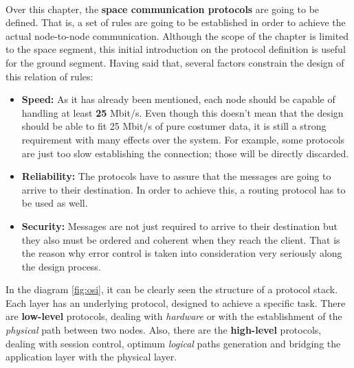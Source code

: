 \paragraph{}
Over this chapter, the \textbf{space communication protocols} are going to be defined. That is, a set of rules are going to be established in order to achieve the actual node-to-node communication. Although the scope of the chapter is limited to the space segment, this initial introduction on the protocol definition is useful for the ground segment.
Having said that, several factors constrain the design of this relation of rules:

\begin{itemize}
\renewcommand{\labelitemi}{\scriptsize$\blacksquare$} 
\item \textbf{Speed:} As it has already been mentioned, each node should be capable of handling at least \textbf{25} Mbit/s. Even though this doesn't mean that the design should be able to fit 25 Mbit/s of pure costumer data, it is still a strong requirement with many effects over the system. For example, some protocols are just too slow establishing the connection; those will be directly discarded.

\item \textbf{Reliability:} The protocols have to assure that the messages are going to arrive to their destination. In order to achieve this, a routing protocol has to be used as well.


\item \textbf{Security:} Messages are not just required to arrive to their destination but they also must be ordered and coherent when they reach the client. That is the reason why error control is taken into consideration very seriously along the design process.
\end{itemize}
In the diagram \ref{fig:osi}, it can be clearly seen the structure of a protocol stack. Each layer has an underlying protocol, designed to achieve a specific task. There are \textbf{low-level} protocols, dealing with \textit{hardware} or with the establishment of the \textit{physical} path between two nodes. Also, there are the \textbf{high-level} protocols, dealing with session control, optimum \textit{logical} paths generation and bridging the application layer with the physical layer.
